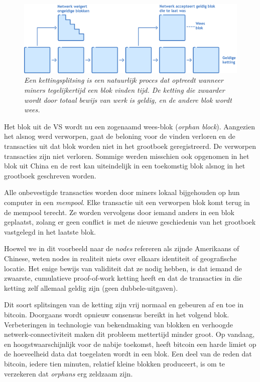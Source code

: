 \documentclass[smalldemyvopaper,11pt,twoside,onecolumn,openright,extrafontsizes]{memoir}
\begin{document}
\begin{figure}
    \centering
    \includegraphics[width=\textwidth]{images/fig12.png}
    \caption{\footnotesize{\textit{Een kettingsplitsing is een natuurlijk proces dat optreedt wanneer miners tegelijkertijd een blok vinden tijd. De ketting die zwaarder wordt door totaal bewijs van werk is geldig, en de andere blok wordt wees.}}}
    \label{fig12}
\end{figure}



Het blok uit de VS wordt nu een zogenaamd wees-blok (\textit{orphan block}). Aangezien het alsnog werd verworpen, gaat de beloning voor de vinden verloren en de transacties uit dat blok worden niet in het grootboek geregistreerd. De verworpen transacties zijn niet verloren. Sommige werden misschien ook opgenomen in het blok uit China en de rest kan uiteindelijk in een toekomstig blok alsnog in het grootboek geschreven worden.

Alle onbevestigde transacties worden door miners lokaal bijgehouden op hun computer in een \textit{mempool}. Elke transactie uit een verworpen blok komt terug in de mempool terecht. Ze worden vervolgens door iemand anders in een blok geplaatst, zolang er geen conflict is met de nieuwe geschiedenis van het grootboek vastgelegd in het laatste blok.

Hoewel we in dit voorbeeld naar de \textit{nodes} refereren als zijnde Amerikaans of Chinese, weten nodes in realiteit niets over elkaars identiteit of geografische locatie. Het enige bewijs van validiteit dat ze nodig hebben, is dat iemand de zwaarste, cumulatieve proof-of-work ketting heeft en dat de transacties in die ketting zelf allemaal geldig zijn (geen dubbele-uitgaven).

Dit soort splitsingen van de ketting zijn vrij normaal en gebeuren af en toe in bitcoin. Doorgaans wordt opnieuw consensus bereikt in het volgend blok. Verbeteringen in technologie van bekendmaking van blokken en verhoogde netwerk-connectiviteit maken dit probleem mettertijd minder groot. Op vandaag, en hoogstwaarschijnlijk voor de nabije toekomst, heeft bitcoin een harde limiet op de hoeveelheid data dat toegelaten wordt in een blok. Een deel van de reden dat bitcoin, iedere tien minuten, relatief kleine blokken produceert, is om te verzekeren dat \textit{orphans} erg zeldzaam zijn.
\end{document}
